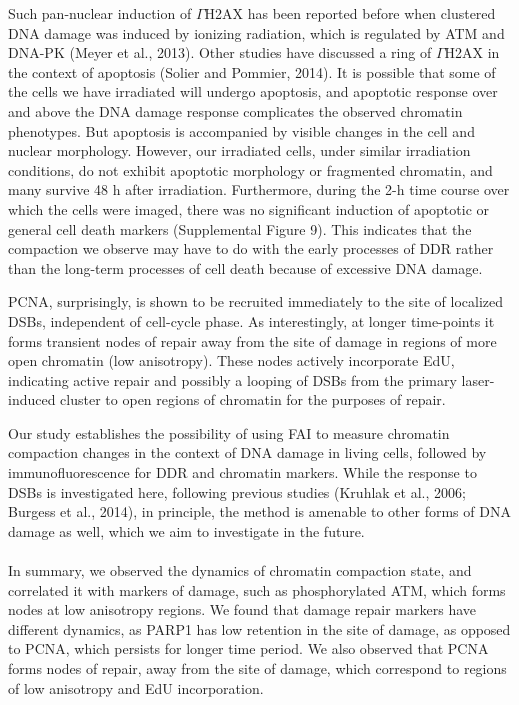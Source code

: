 Such pan-nuclear induction of $\Gamma$H2AX has been reported before when clustered DNA damage was induced by ionizing radiation, which is regulated by ATM and DNA-PK (Meyer et al., 2013). Other studies have discussed a ring of $\Gamma$H2AX in the context of apoptosis (Solier and Pommier, 2014). It is possible that some of the cells we have irradiated will undergo apoptosis, and apoptotic response over and above the DNA damage response complicates the observed chromatin phenotypes. But apoptosis is accompanied by visible changes in the cell and nuclear morphology. However, our irradiated cells, under similar irradiation conditions, do not exhibit apoptotic morphology or fragmented chromatin, and many survive 48 h after irradiation. Furthermore, during the 2-h time course over which the cells were imaged, there was no significant induction of apoptotic or general cell death markers (Supplemental Figure 9). This indicates that the compaction we observe may have to do with the early processes of DDR rather than the long-term processes of cell death because of excessive DNA damage.

PCNA, surprisingly, is shown to be recruited immediately to the site of localized DSBs, independent of cell-cycle phase. As interestingly, at longer time-points it forms transient nodes of repair away from the site of damage in regions of more open chromatin (low anisotropy). These nodes actively incorporate EdU, indicating active repair and possibly a looping of DSBs from the primary laser-induced cluster to open regions of chromatin for the purposes of repair.

Our study establishes the possibility of using FAI to measure chromatin compaction changes in the context of DNA damage in living cells, followed by immunofluorescence for DDR and chromatin markers. While the response to DSBs is investigated here, following previous studies (Kruhlak et al., 2006; Burgess et al., 2014), in principle, the method is amenable to other forms of DNA damage as well, which we aim to investigate in the future.

\paragraph*{} In summary, we observed the dynamics of chromatin compaction state, and correlated it with markers of damage, such as phosphorylated ATM, which forms nodes at low anisotropy regions. We found that damage repair markers have different dynamics, as PARP1 has low retention in the site of damage, as opposed to PCNA, which persists for longer time period. We also observed that PCNA forms nodes of repair, away from the site of damage, which correspond to regions of low anisotropy and EdU incorporation.

